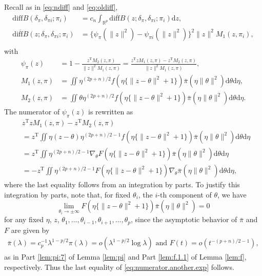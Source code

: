 \documentclass[preprint,11pt]{imsart}
\numberwithin{equation}{section}
\theoremstyle{plain}
\theoremstyle{definition}
\theoremstyle{remark}
\def\T{{ \mathrm{\scriptscriptstyle T} }}
\newcommand{\rd}{\mathrm{d}}
\newcommand{\oldiff}{\overline{\mathrm{diff}B}}
\newcommand{\ndiff}{\mathrm{diff}B}
\begin{document}
Recall
as in \eqref{eq:ndiff} and \eqref{eq:oldiff},
\begin{equation}\label{eq:ndiff.oldiff.ap}
 \begin{split}
 \ndiff(\delta_\pi,\delta_{\pi i};\pi_i) 
&=c_n\int_{\mathbb{R}^p}\oldiff(z;\delta_\pi,\delta_{\pi i};\pi_i) \rd z, \\
 \oldiff(z;\delta_\pi,\delta_{\pi i};\pi_i)
  &=\{\psi_{\pi }(\|z\|^2)-\psi_{\pi i}(\|z\|^2)\}^2\|z\|^2M_1(z,\pi_i), \\
\end{split}
\end{equation}
with
\begin{align*}
 \psi_\pi(z)&=1- \frac{z^\T M_2(z,\pi)}{\|z\|^2 M_1(z,\pi)}=\frac{z^\T z M_1(z,\pi)- z^\T M_2(z,\pi)}{\|z\|^2 M_1(z,\pi)}, \\
 M_1(z,\pi)&=
 \iint \eta^{(2p+n)/2}f(\eta\{\|z-\theta\|^2+1\})
\bar{\pi}(\eta\|\theta\|^2) \rd \theta   \rd \eta,  \\
 M_2(z,\pi)&=
\iint \theta
  \eta^{(2p+n)/2} f(\eta\{\|z-\theta\|^2+1\}) \bar{\pi}(\eta\|\theta\|^2) \rd \theta  \rd \eta.
\end{align*}
The numerator of $\psi_\pi(z)$ is rewritten as
\begin{equation}\label{eq:numerator.another.exp}
 \begin{split}
&z^\T z M_1(z,\pi)- z^\T M_2(z,\pi) \\
&= z^\T\iint \eta (z-\theta)
  \eta^{(2p+n)/2-1} f(\eta\{\|z-\theta\|^2+1\}) 
\bar{\pi}(\eta\|\theta\|^2) \rd \theta  \rd \eta \\
 &= z^\T\iint 
 \eta^{(2p+n)/2-1} \nabla_\theta F(\eta\{\|z-\theta\|^2+1\})
 \bar{\pi}(\eta\|\theta\|^2) \rd \theta   \rd \eta \\
 &= -z^\T\iint 
  \eta^{(2p+n)/2-1} F(\eta\{\|z-\theta\|^2+1\}) \nabla_\theta\bar{\pi}(\eta\|\theta\|^2) \rd \theta   \rd \eta,
\end{split}
\end{equation}
where the last equality follows from an integration by parts. 
To justify this integration by parts, note that, for fixed $\theta_i$, the $i$-th component of $\theta$, we have
\begin{equation*}
 \lim_{\theta_i\to\pm\infty}F(\eta\{\|z-\theta\|^2+1\}) \bar{\pi}(\eta\|\theta\|^2)=0
\end{equation*}
for any fixed $\eta$, $z$, $\theta_1,\dots,\theta_{i-1},\theta_{i+1},\dots,\theta_p$,
since the asymptotic behavior of $\bar{\pi}$ and $F$ are 
given by
\begin{align*}
 \bar{\pi}(\lambda)=c_p^{-1}\lambda^{1-p/2}\pi(\lambda)=o(\lambda^{1-p/2}\log\lambda)
\text{ and }F(t)=o(t^{-(p+n)/2-1}),
\end{align*}
as in Part \ref{lem:pi:7} of Lemma \ref{lem:pi} and
Part \ref{lem:f.1.1} of Lemma \ref{lem:f}, respectively.
Thus the last equality of \eqref{eq:numerator.another.exp} follows.
\end{document}
